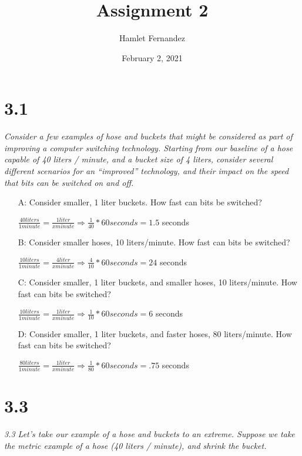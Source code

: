\documentclass[10pt]{article}
\title{Assignment 2}
\author{Hamlet Fernandez}
\date{February 2, 2021}
\begin{document}
\maketitle{}

\section{3.1}

\textit{Consider a few examples of hose and buckets that might be considered as part of
improving a computer switching technology. Starting from our baseline of a hose capable
of 40 liters / minute, and a bucket size of 4 liters, consider several different scenarios for
an “improved” technology, and their impact on the speed that bits can be switched on and
off.}

\begin{itemize}

    \item[A:] Consider smaller, 1 liter buckets. How fast can bits be switched?
    \item[] $\frac{40 liters}{1 minute} = \frac{1 liter}{x minute} \Rightarrow \frac{1}{40} * 60 seconds = 1.5$ seconds
    \item[B:] Consider smaller hoses, 10 liters/minute. How fast can bits be switched?
    \item[] $\frac{10 liters}{1 minute} = \frac{4 liter}{x minute} \Rightarrow \frac{4}{10} * 60 seconds = 24$ seconds
    \item[C:] Consider smaller, 1 liter buckets, and smaller hoses, 10 liters/minute. How fast can
    bits be switched? 
    \item[] $\frac{10 liters}{1 minute} = \frac{1 liter}{x minute} \Rightarrow \frac{1}{10} * 60 seconds = 6$ seconds
    \item[D:] Consider smaller, 1 liter buckets, and faster hoses, 80 liters/minute. How fast can bits
    be switched?
    \item[] $\frac{80 liters}{1 minute} = \frac{1 liter}{x minute} \Rightarrow \frac{1}{80} * 60 seconds = .75$ seconds
    
\end{itemize}


\section{3.3}

\textit{3.3 Let’s take our example of a hose and buckets to an extreme. Suppose we take the
metric example of a hose (40 liters / minute), and shrink the bucket.}
\end{document}
